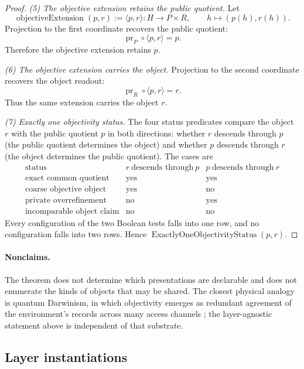\begin{proof}
\emph{(5) The objective extension retains the public quotient.}
Let
\[
  \operatorname{objectiveExtension}(p,r)
  :=
  \langle p,r\rangle:H\longrightarrow P\times R,
  \qquad
  h\longmapsto (p(h),r(h)).
\]
Projection to the first coordinate recovers the public quotient:
\[
  \operatorname{pr}_P\circ\langle p,r\rangle=p.
\]
Therefore the objective extension retains \(p\).

\emph{(6) The objective extension carries the object.}
Projection to the second coordinate recovers the object readout:
\[
  \operatorname{pr}_R\circ\langle p,r\rangle=r.
\]
Thus the same extension carries the object \(r\).

\emph{(7) Exactly one objectivity status.}
The four status predicates compare the object \(r\) with the public
quotient \(p\) in both directions: whether \(r\) descends through \(p\)
(the public quotient determines the object) and whether \(p\) descends
through \(r\) (the object determines the public quotient).  The cases
are
\[
\begin{array}{c|c|c}
\text{status} & r\ \text{descends through}\ p
  & p\ \text{descends through}\ r\\
\hline
\text{exact common quotient} & \text{yes} & \text{yes}\\
\text{coarse objective object} & \text{yes} & \text{no}\\
\text{private overrefinement} & \text{no} & \text{yes}\\
\text{incomparable object claim} & \text{no} & \text{no}
\end{array}
\]
Every configuration of the two Boolean tests falls into one row, and
no configuration falls into two rows.  Hence
\(\operatorname{ExactlyOneObjectivityStatus}(p,r)\).
\end{proof}

\paragraph{Nonclaims.} The theorem does not determine which presentations are declarable and
does not enumerate the kinds of objects that may be shared.  The
closest physical analogy is quantum Darwinism, in which
objectivity emerges as redundant agreement of the environment's
records across many access channels \citep{Zurek2009QuantumDarwinism};
the layer-agnostic statement above is independent of that
substrate.

\subsection*{Layer instantiations}\label{layer-inst:F17}

